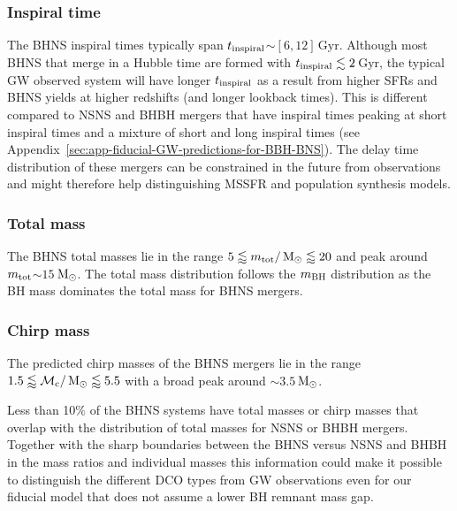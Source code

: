 \documentclass[twocolumn]{aastex63}
\newcommand\bhnsSingle{BHNS\xspace}
\newcommand{\Msun}{\ensuremath{\,\rm{M}_{\odot}}\xspace}
\newcommand{\Gyr}{\ensuremath{\,\mathrm{Gyr}}\xspace}
\newcommand{\Gyrs}{\ensuremath{\,\mathrm{Gyr}}\xspace}
\newcommand{\tinspiral}{\ensuremath{{t}_{\rm{inspiral}}}\xspace}
\newcommand{\mbhf}{\ensuremath{m_{\rm{BH}}}\xspace}
\newcommand{\mtotf}{\ensuremath{m_{\rm{tot}}}\xspace}
\newcommand{\mchirpf}{\ensuremath{{\mathcal{M}}_{\rm{c}}}\xspace}
\begin{document}
\subsubsection{Inspiral time} 
The \bhnsSingle inspiral times typically span \tinspiral $\sim [6,12]$\Gyrs.   
Although most \bhnsSingle that merge in a Hubble time are formed with   $\tinspiral \lesssim 2$\Gyr, the typical \ac{GW} observed system will have longer \tinspiral as a result from higher SFRs and  \bhnsSingle yields at higher redshifts (and longer lookback times).  
This is different compared to  \ac{NSNS} and \ac{BHBH} mergers that have inspiral times peaking at short inspiral times and a mixture of short and long inspiral times  (see Appendix~\ref{sec:app-fiducial-GW-predictions-for-BBH-BNS}). 
The delay time distribution of these mergers can be constrained in the future from observations \citep{2019ApJ...878L..14S,2018ApJ...863L..41F} and might therefore help distinguishing \ac{MSSFR} and population synthesis models. 

\subsubsection{Total mass}
 The \bhnsSingle total masses lie in the range $5 \lessapprox \mtotf / \Msun \lessapprox 20$ and peak around \mtotf $\sim 15$\Msun. The total mass distribution follows the \mbhf distribution as the \ac{BH} mass dominates the total mass for \bhnsSingle mergers. 

\subsubsection{Chirp mass}
The predicted chirp masses of the  \bhnsSingle mergers lie in the range $1.5 \lessapprox \mchirpf/ \Msun \lessapprox  5.5$ with a broad peak around $\sim3.5$\Msun. 


Less than 10$\%$ of the \bhnsSingle systems have total masses or chirp masses that overlap with the distribution of total masses for \ac{NSNS} or \ac{BHBH} mergers. Together with the sharp boundaries between the \bhnsSingle versus \ac{NSNS} and \ac{BHBH} in the mass ratios and individual masses this information could make it possible to distinguish the different \ac{DCO} types from \ac{GW} observations \citep[c.f.][]{2013ApJ...766L..14H,2015ApJ...807L..24L,2015MNRAS.450L..85M,2018ApJ...856..110Y} even for our fiducial model that does not  assume a lower \ac{BH} remnant mass gap.
\end{document}
